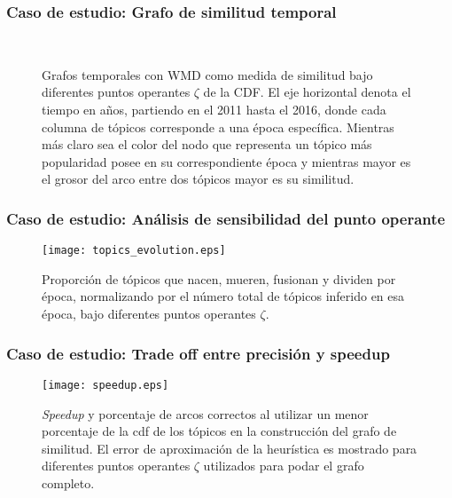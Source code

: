 \documentclass[
	spanish, %
	aspectratio=43, %
	hyperref={pdfencoding=auto,psdextra},
	xcolor={dvipsnames,table,usenames},
]{beamer}
\begin{document}
\begin{frame}[t]
\frametitle{Caso de estudio: Grafo de similitud temporal}

\vspace*{-0.2in}
\begin{figure}
\\
\caption{Grafos temporales con WMD como medida de similitud bajo diferentes puntos operantes $\zeta$ de la CDF. El eje horizontal denota el tiempo en años, partiendo en el 2011 hasta el 2016, donde cada columna de tópicos corresponde a una época específica. Mientras más claro sea el color del nodo que representa un tópico más popularidad posee en su correspondiente época y mientras mayor es el grosor del arco entre dos tópicos mayor es su similitud.}
\label{img:temporal_similarity_graphs}
\end{figure}

\end{frame}


\begin{frame}[t]
\frametitle{Caso de estudio: Análisis de sensibilidad del punto operante}
\begin{figure}

\vspace*{-0.2in}
\texttt{[image: topics\_evolution.eps]}
\caption{Proporción de tópicos que nacen, mueren, fusionan y dividen por época, normalizando por el número total de tópicos inferido en esa época, bajo diferentes puntos operantes $\zeta$.}
\label{img:topics_evolution}
\end{figure}

\end{frame}


\begin{frame}[t]
\frametitle{Caso de estudio: Trade off entre precisión y speedup}
\vspace*{-0.2in}
\begin{figure}
\texttt{[image: speedup.eps]}
\caption{\textit{Speedup} y porcentaje de arcos correctos al utilizar un menor porcentaje de la cdf de los tópicos en la construcción del grafo de similitud. El error de aproximación de la heurística es mostrado para diferentes puntos operantes $\zeta$ utilizados para podar el grafo completo.} 
\label{img:speedup}
\end{figure}

\end{frame}
\end{document}
